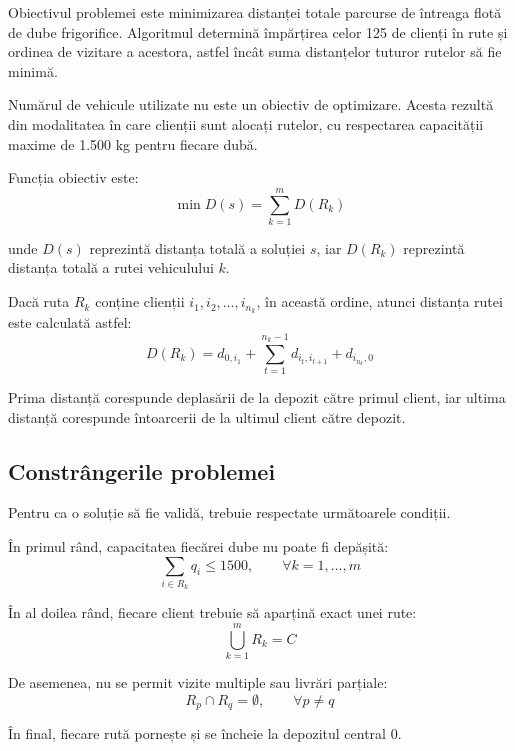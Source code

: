 \documentclass[12pt,a4paper]{article}
\begin{document}
Obiectivul problemei este minimizarea distanței totale parcurse de întreaga flotă de dube frigorifice. Algoritmul determină împărțirea celor 125 de clienți în rute și ordinea de vizitare a acestora, astfel încât suma distanțelor tuturor rutelor să fie minimă.

Numărul de vehicule utilizate nu este un obiectiv de optimizare. Acesta rezultă din modalitatea în care clienții sunt alocați rutelor, cu respectarea capacității maxime de 1.500 kg pentru fiecare dubă.

Funcția obiectiv este:
\begin{equation}
\min D(s)=\sum_{k=1}^{m}D(R_k)
\end{equation}

unde $D(s)$ reprezintă distanța totală a soluției $s$, iar $D(R_k)$ reprezintă distanța totală a rutei vehiculului $k$.

Dacă ruta $R_k$ conține clienții $i_1,i_2,\ldots,i_{n_k}$, în această ordine, atunci distanța rutei este calculată astfel:
\begin{equation}
D(R_k)=d_{0,i_1}+\sum_{t=1}^{n_k-1}d_{i_t,i_{t+1}}+d_{i_{n_k},0}
\end{equation}

Prima distanță corespunde deplasării de la depozit către primul client, iar ultima distanță corespunde întoarcerii de la ultimul client către depozit.

\subsection{Constrângerile problemei}

Pentru ca o soluție să fie validă, trebuie respectate următoarele condiții.

În primul rând, capacitatea fiecărei dube nu poate fi depășită:
\begin{equation}
\sum_{i\in R_k}q_i\leq 1500,\qquad \forall k=1,\ldots,m
\end{equation}

În al doilea rând, fiecare client trebuie să aparțină exact unei rute:
\begin{equation}
\bigcup_{k=1}^{m}R_k=C
\end{equation}

De asemenea, nu se permit vizite multiple sau livrări parțiale:
\begin{equation}
R_p\cap R_q=\emptyset,\qquad \forall p\neq q
\end{equation}

În final, fiecare rută pornește și se încheie la depozitul central $0$.
\end{document}
